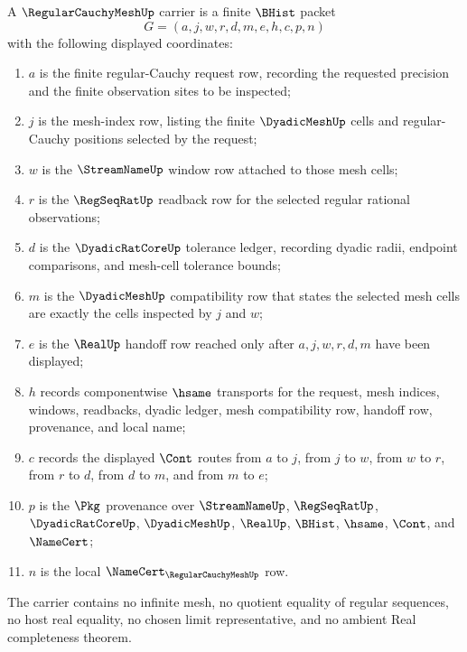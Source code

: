 \begin{definition}
\label{def:regular-cauchy-mesh-carrier}
A $\RegularCauchyMeshUp$ carrier is a finite $\BHist$ packet
$$
G=(a,j,w,r,d,m,e,h,c,p,n)
$$
with the following displayed coordinates:
\begin{enumerate}
\item $a$ is the finite regular-Cauchy request row, recording the requested precision and the finite observation sites to be inspected;
\item $j$ is the mesh-index row, listing the finite $\DyadicMeshUp$ cells and regular-Cauchy positions selected by the request;
\item $w$ is the $\StreamNameUp$ window row attached to those mesh cells;
\item $r$ is the $\RegSeqRatUp$ readback row for the selected regular rational observations;
\item $d$ is the $\DyadicRatCoreUp$ tolerance ledger, recording dyadic radii, endpoint comparisons, and mesh-cell tolerance bounds;
\item $m$ is the $\DyadicMeshUp$ compatibility row that states the selected mesh cells are exactly the cells inspected by $j$ and $w$;
\item $e$ is the $\RealUp$ handoff row reached only after $a,j,w,r,d,m$ have been displayed;
\item $h$ records componentwise $\hsame$ transports for the request, mesh indices, windows, readbacks, dyadic ledger, mesh compatibility row, handoff row, provenance, and local name;
\item $c$ records the displayed $\Cont$ routes from $a$ to $j$, from $j$ to $w$, from $w$ to $r$, from $r$ to $d$, from $d$ to $m$, and from $m$ to $e$;
\item $p$ is the $\Pkg$ provenance over $\StreamNameUp$, $\RegSeqRatUp$, $\DyadicRatCoreUp$, $\DyadicMeshUp$, $\RealUp$, $\BHist$, $\hsame$, $\Cont$, and $\NameCert$;
\item $n$ is the local $\NameCert_{\RegularCauchyMeshUp}$ row.
\end{enumerate}
The carrier contains no infinite mesh, no quotient equality of regular sequences, no host real equality, no chosen limit representative, and no ambient Real completeness theorem.
\end{definition}

